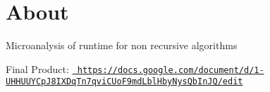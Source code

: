 \chapter{About}
\hypertarget{md__about}{}\label{md__about}
Microanalysis of runtime for non recursive algorithms

Final Product\+: \href{https://docs.google.com/document/d/1-UHHUUYCpJ8IXDqTn7qviCUoF9mdLblHbyNysQbInJQ/edit}{\texttt{ https\+://docs.\+google.\+com/document/d/1-\/\+UHHUUYCp\+J8\+IXDq\+Tn7qvi\+CUo\+F9md\+Lbl\+Hby\+Nys\+Qb\+In\+JQ/edit}} 